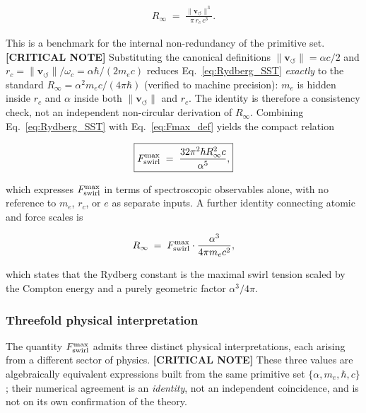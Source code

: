 \documentclass[11pt]{article}
\theoremstyle{definition}
\theoremstyle{plain}
\theoremstyle{remark}
\newcommand{\rc}{{r_c}}
\newcommand{\vnorm}{\lVert \mathbf{v}_{\!\boldsymbol{\circlearrowleft}} \rVert}
\begin{document}
        \begin{align}
            R_\infty \;=\; \frac{\vnorm^3}{\pi\,\rc\,c^3}.
            \label{eq:Rydberg_SST}
        \end{align}

        This is a benchmark for the internal non-redundancy of the primitive set. \textbf{[CRITICAL NOTE]} Substituting the canonical definitions $\vnorm=\alpha c/2$ and $\rc=\vnorm/\omega_c=\alpha\hbar/(2m_ec)$ reduces Eq.~\eqref{eq:Rydberg_SST} \emph{exactly} to the standard $R_\infty=\alpha^2 m_e c/(4\pi\hbar)$ (verified to machine precision): $m_e$ is hidden inside $\rc$ and $\alpha$ inside both $\vnorm$ and $\rc$. The identity is therefore a consistency check, not an independent non-circular derivation of $R_\infty$. Combining Eq.~\eqref{eq:Rydberg_SST} with Eq.~\eqref{eq:Fmax_def} yields the compact relation

        \begin{align}
            \boxed{
            F_{\rm swirl}^{\max}
            \;=\; \frac{32\pi^2\hbar R_\infty^2 c}{\alpha^5},
            }
            \label{eq:Fmax_Rydberg}
        \end{align}

        which expresses $F_{\rm swirl}^{\max}$ in terms of spectroscopic observables alone, with no reference to $m_e$, $\rc$, or $e$ as separate inputs. A further identity connecting atomic and force scales is

        \begin{align}
            R_\infty \;=\; F_{\rm swirl}^{\max} \cdot \frac{\alpha^3}{4\pi m_e c^2},
            \label{eq:Rydberg_Fmax}
        \end{align}

        which states that the Rydberg constant is the maximal swirl tension scaled by the Compton energy and a purely geometric factor $\alpha^3/4\pi$.

        \subsubsection{Threefold physical interpretation}

        The quantity $F_{\rm swirl}^{\max}$ admits three distinct physical interpretations, each arising from a different sector of physics. \textbf{[CRITICAL NOTE]} These three values are algebraically equivalent expressions built from the same primitive set $\{\alpha,m_e,\hbar,c\}$; their numerical agreement is an \emph{identity}, not an independent coincidence, and is not on its own confirmation of the theory.
\end{document}
